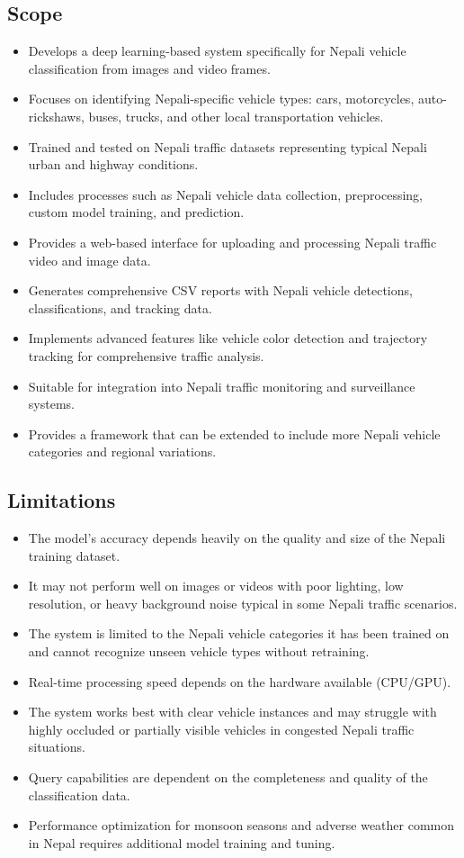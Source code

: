 \documentclass[12pt,a4paper]{report}
\begin{document}
\subsection*{Scope}
\begin{itemize}
    \item Develops a deep learning-based system specifically for Nepali vehicle classification from images and video frames.
    \item Focuses on identifying Nepali-specific vehicle types: cars, motorcycles, auto-rickshaws, buses, trucks, and other local transportation vehicles.
    \item Trained and tested on Nepali traffic datasets representing typical Nepali urban and highway conditions.
    \item Includes processes such as Nepali vehicle data collection, preprocessing, custom model training, and prediction.
    \item Provides a web-based interface for uploading and processing Nepali traffic video and image data.
    \item Generates comprehensive CSV reports with Nepali vehicle detections, classifications, and tracking data.
    \item Implements advanced features like vehicle color detection and trajectory tracking for comprehensive traffic analysis.
    \item Suitable for integration into Nepali traffic monitoring and surveillance systems.
    \item Provides a framework that can be extended to include more Nepali vehicle categories and regional variations.
\end{itemize}

\subsection*{Limitations}
\begin{itemize}
    \item The model's accuracy depends heavily on the quality and size of the Nepali training dataset.
    \item It may not perform well on images or videos with poor lighting, low resolution, or heavy background noise typical in some Nepali traffic scenarios.
    \item The system is limited to the Nepali vehicle categories it has been trained on and cannot recognize unseen vehicle types without retraining.
    \item Real-time processing speed depends on the hardware available (CPU/GPU).
    \item The system works best with clear vehicle instances and may struggle with highly occluded or partially visible vehicles in congested Nepali traffic situations.
    \item Query capabilities are dependent on the completeness and quality of the classification data.
    \item Performance optimization for monsoon seasons and adverse weather common in Nepal requires additional model training and tuning.
\end{itemize}
\end{document}
